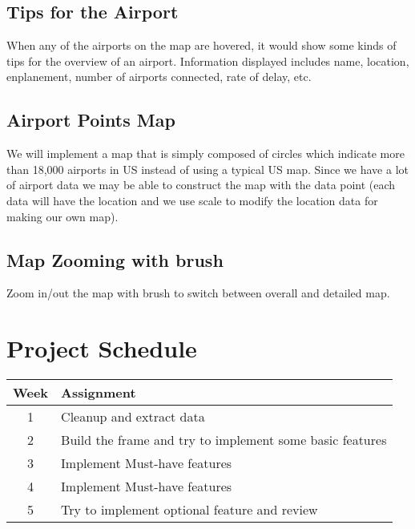 \documentclass[12pt]{article}
\begin{document}
    \subsection{Tips for the Airport}
    When any of the airports on the map are hovered, it would show some kinds of tips for the overview of an airport. Information displayed includes name, location, enplanement, number of airports connected, rate of delay, etc.
    \subsection{Airport Points Map}
    We will implement a map that is simply composed of circles which indicate more than 18,000 airports in US instead of using a typical US map. Since we have a lot of airport data we may be able to construct the map with the data point (each data will have the location and we use scale to modify the location data for making our own map).
    \subsection{Map Zooming with brush}
    Zoom in/out the map with brush to switch between overall and detailed map.
\section{Project Schedule}
\begin{table}[H]
\center
  \begin{tabular}{c|l}
  \hline
  Week & Assignment\\
  \hline
  1 & Cleanup and extract data\\
  2 & Build the frame and try to implement some basic features \\
  3 & Implement Must-have features \\
  4 & Implement Must-have features \\
  5 & Try to implement optional feature and review\\
  \hline
\end{tabular}
\end{table}





\newpage
\renewcommand\refname{Reference}


\end{document}
